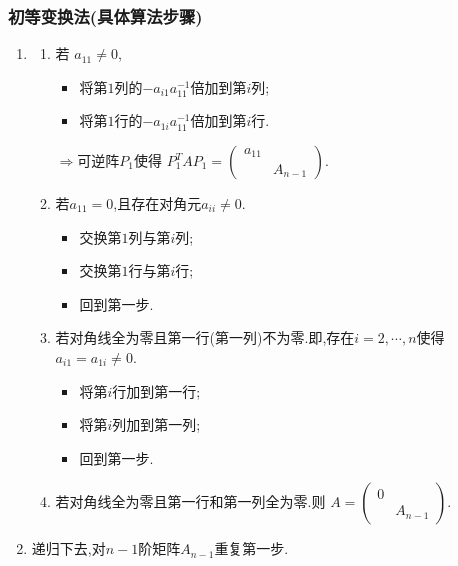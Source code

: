 \begin{frame}\frametitle{初等变换法(具体算法步骤)}
\begin{enumerate}
\item[第一步:]
\pp
\begin{enumerate}
\item 若 $a_{11}\neq 0$,
\begin{itemize}
\item 将第$1$列的$-a_{i1}a_{11}^{-1}$倍加到第$i$列;
\item 将第$1$行的$-a_{1i}a_{11}^{-1}$倍加到第$i$行.
\end{itemize}
$\Rightarrow$可逆阵$P_1$使得 $P_1^TAP_1=\begin{pmatrix}a_{11}&\\&A_{n-1}\end{pmatrix}$.
\pp
\item 若$a_{11}=0$,且存在对角元$a_{ii}\neq0$.
\begin{itemize}
\item 交换第$1$列与第$i$列;
\item 交换第$1$行与第$i$行;
\item 回到第一步.
\end{itemize}
\pp
\item 若对角线全为零且第一行(第一列)不为零.即,存在$i=2,\cdots,n$使得$a_{i1}=a_{1i}\neq0$.
\begin{itemize}
\item 将第$i$行加到第一行;
\item 将第$i$列加到第一列;
\item 回到第一步.
\end{itemize}
\pp
\item 若对角线全为零且第一行和第一列全为零.则 $A=\begin{pmatrix}0&\\&A_{n-1}\end{pmatrix}$.
\end{enumerate}
\pp
\item[第二步:] 递归下去,对$n-1$阶矩阵$A_{n-1}$重复第一步.
\end{enumerate}
\end{frame}






